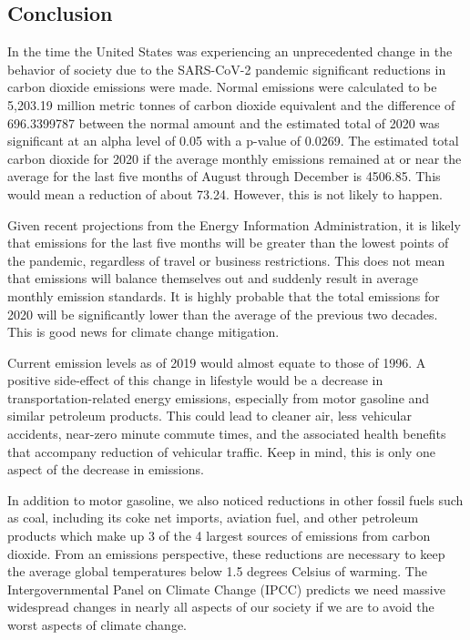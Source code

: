 \documentclass[
]{article}
\begin{document}
\hypertarget{conclusion}{%
\subsection{Conclusion}\label{conclusion}}

In the time the United States was experiencing an unprecedented change
in the behavior of society due to the SARS-CoV-2 pandemic significant
reductions in carbon dioxide emissions were made. Normal emissions were
calculated to be 5,203.19 million metric tonnes of carbon dioxide
equivalent and the difference of 696.3399787 between the normal amount
and the estimated total of 2020 was significant at an alpha level of
0.05 with a p-value of 0.0269. The estimated total carbon dioxide for
2020 if the average monthly emissions remained at or near the average
for the last five months of August through December is 4506.85. This
would mean a reduction of about 73.24. However, this is not likely to
happen.

Given recent projections from the Energy Information Administration, it
is likely that emissions for the last five months will be greater than
the lowest points of the pandemic, regardless of travel or business
restrictions. This does not mean that emissions will balance themselves
out and suddenly result in average monthly emission standards. It is
highly probable that the total emissions for 2020 will be significantly
lower than the average of the previous two decades. This is good news
for climate change mitigation.

Current emission levels as of 2019 would almost equate to those of 1996.
A positive side-effect of this change in lifestyle would be a decrease
in transportation-related energy emissions, especially from motor
gasoline and similar petroleum products. This could lead to cleaner air,
less vehicular accidents, near-zero minute commute times, and the
associated health benefits that accompany reduction of vehicular
traffic. Keep in mind, this is only one aspect of the decrease in
emissions.

In addition to motor gasoline, we also noticed reductions in other
fossil fuels such as coal, including its coke net imports, aviation
fuel, and other petroleum products which make up 3 of the 4 largest
sources of emissions from carbon dioxide. From an emissions perspective,
these reductions are necessary to keep the average global temperatures
below 1.5 degrees Celsius of warming. The Intergovernmental Panel on
Climate Change (IPCC) predicts we need massive widespread changes in
nearly all aspects of our society if we are to avoid the worst aspects
of climate change.
\end{document}
